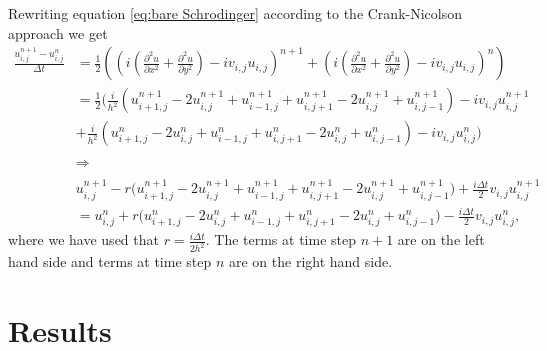 \documentclass[english,notitlepage,reprint,nofootinbib]{revtex4-2}  %
\begin{document}
	\noindent
	Rewriting equation \ref{eq:bare Schrodinger}
	according to the Crank-Nicolson approach we get 
	\onecolumngrid
	\begin{equation}
		\begin{aligned}
		\frac{u^{n+1}_{i,j}-u^{n}_{i,j}}{\Delta t} &=  \frac{1}{2}\left(\left(i(\frac{\partial^2 u}{\partial x^2} + \frac{\partial^2 u}{\partial y^2}) -i v_{i,j} u_{i,j}\right)^{n+1}
	    +   \left(i(\frac{\partial^2 u}{\partial x^2} + \frac{\partial^2 u}{\partial y^2}) -i v_{i,j} u_{i,j}\right)^{n} \right)\\
		&=  \frac{1}{2}\Big(    \frac{i}{h^2}\left(  u^{n+1}_{i+1,j}-2u^{n+1}_{i,j}+u^{n+1}_{i-1,j}   +u^{n+1}_{i,j+1}-2u^{n+1}_{i,j}+u^{n+1}_{i,j-1}\right)-iv_{i,j}u^{n+1}_{i,j}\\
		&+ \frac{i}{h^2}\left(  u^{n}_{i+1,j}-2u^{n}_{i,j}+u^{n}_{i-1,j}   +u^{n}_{i,j+1}-2u^{n}_{i,j}+u^{n}_{i,j-1}\right)-iv_{i,j}u^{n}_{i,j}      \Big)\\ 
		&\ \\
		&\Rightarrow \\ 
		&\ \\
		&u^{n+1}_{i,j} -r\Big(  u^{n+1}_{i+1,j}-2u^{n+1}_{i,j}+u^{n+1}_{i-1,j}   +u^{n+1}_{i,j+1}-2u^{n+1}_{i,j}+u^{n+1}_{i,j-1}\Big) +\frac{i\Delta t}{2}v_{i,j}u^{n+1}_{i,j}\\
		&= u^n_{i,j}+ r\Big(  u^{n}_{i+1,j}-2u^{n}_{i,j}+u^{n}_{i-1,j}   +u^{n}_{i,j+1}-2u^{n}_{i,j}+u^{n}_{i,j-1}\Big)-\frac{i\Delta t}{2}v_{i,j}u^{n}_{i,j},
		\end{aligned}
	\end{equation}
	\twocolumngrid
	\noindent
	where we have used that $r = \frac{i\Delta t}{2h^2}$. The terms at time
	step $n+1$ are on the left hand side and terms at time step $n$ are on the right
	hand side.

	


	
	
	\section{Results}\label{sec:results}
\end{document}
